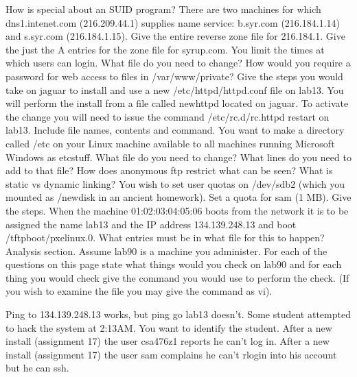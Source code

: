 \vskip 1.2in
\ques
How is special about an SUID program?
\vskip 1.5in
\ques
There are two machines for which {\ltt{}dns1.intenet.com} ({\ltt{}216.209.44.1})
supplies name service:
{\ltt{}b.syr.com} ({\ltt{}216.184.1.14}) and 
{\ltt{}s.syr.com} ({\ltt{}216.184.1.15}).
Give the entire reverse zone file for {\ltt{}216.184.1}.
\vskip 2.2in
\vfill
\ques
Give the just the {\ltt{}A} entries for the zone file for {\ltt{}syrup.com}.
\vskip 1.2in
\eject
\ques
You limit the times at which users can login.
What file do you need to change?
\vskip 0.6in
\ques
How would you require a password for web access to files in
{\ltt{}/var/www/private}?
\vskip 2.0in
\ques
Give the steps you would take on {\ltt{}jaguar} to install and use
a new {\ltt{}/etc/httpd/httpd.conf} file on {\ltt{}lab13}.
You will perform the install from a file called {\ltt{}newhttpd}
located on {\ltt{}jaguar}.
To activate the change you will need to issue the command
{\ltt{}/etc/rc.d/rc.httpd restart} on {\ltt{}lab13}.
Include file names, contents and command.
\vskip 2.6in
\ques
You want to make a directory called {\ltt{}/etc} on your
Linux machine available to all machines running Microsoft Windows as
{\ltt{}etcstuff}.
What file do you need to change?
What lines do you need to add to that file?
\vskip 1.2in
\vfill\eject
\ques
How does anonymous ftp restrict what can be seen?
\vskip 1.0in
\ques
What is static vs dynamic linking?
\vskip 1.0in
\ques
You wish to set user quotas on {\ltt{}/dev/sdb2} (which you mounted
as {\ltt{}/newdisk} in an ancient homework).
Set a quota for {\ltt{}sam} (1 MB).
Give the steps.
\vskip 3.0in
\ques
When the machine {\ltt{}01:02:03:04:05:06} boots from the network
it is to be assigned the name {\ltt{}lab13} and the IP address
{\ltt{}134.139.248.13} and boot {\ltt{}/tftpboot/pxelinux.0}.
What entries must be in what file for this to happen?
\vskip 2.0in
\vfill\eject
Analysis section. Assume {\ltt{}lab90} is a machine you administer.
For each of the questions on this page
state what things would you check on {\ltt{}lab90}
and for each thing you would check give the command you would use to
perform the check. (If you wish to examine the file you may give the
command as {\ltt{}vi}).

\ques
Ping to 134.139.248.13 works, but ping go lab13 doesn't.
\vfill
\ques
Some student attempted to hack the system at 2:13AM.
You want to identify the student.
\vfill
\ques
After a new install (assignment 17)
the user {\ltt{}csa476z1} reports he can't log in.
\vfill
\ques
After a new install (assignment 17)
the user {\ltt{}sam} complains he can't {\ltt{}rlogin} into his account
but he can {\ltt{}ssh}.
\bye
